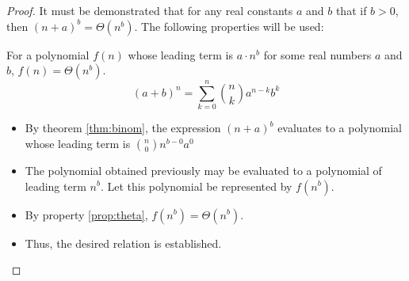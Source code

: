 \begin{proof}
It must be demonstrated that for any real constants $a$ and $b$ that if $b > 0$, then $(n+a)^b = \Theta(n^b)$.
The following properties will be used:
\begin{enumerate}
		For a polynomial $f(n)$ whose leading term is $a \cdot n^b$ for some real numbers $a$ and $b$, $f(n) = \Theta(n^b)$.
		\begin{equation*}
			(a+b)^n = \sum_{k=0}^n \binom{n}{k} a^{n-k} b^k
		\end{equation*}
\end{enumerate}
\begin{itemize}
	\item By theorem \ref{thm:binom}, the expression $(n + a)^b$ evaluates to a polynomial whose leading term is $ \binom{n}{0} n^{b-0} a^0 $
	\item The polynomial obtained previously may be evaluated to a polynomial of leading term $ n^b $. Let this polynomial be represented by $f(n^b)$.
	\item By property \ref{prop:theta}, $ f(n^b) = \Theta(n^b) $.
	\item Thus, the desired relation is established.
\end{itemize}
\end{proof}